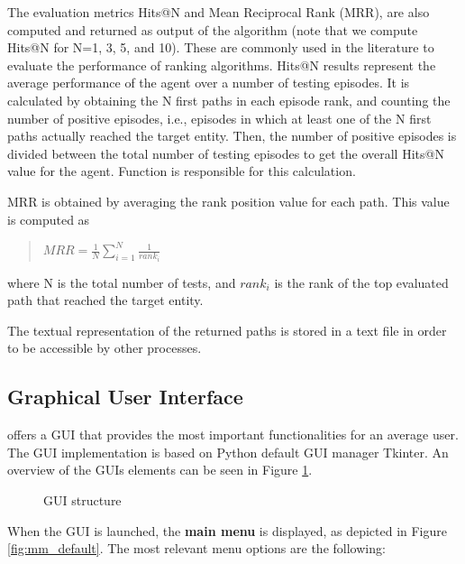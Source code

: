 The evaluation metrics Hits@N and Mean Reciprocal Rank (MRR), are also computed and returned as output of the algorithm (note that we compute Hits@N for N=1, 3, 5, and 10). These are commonly used in the literature to evaluate the performance of ranking algorithms. 
Hits@N results represent the average performance of
the agent over a number of testing episodes. It is calculated by obtaining the 
N first paths in each episode rank, and counting the number of positive episodes, i.e., episodes in which at least one of the N first paths actually reached the target entity. Then, the number of positive episodes is divided between the total number of testing episodes to get the overall Hits@N value for the agent. Function  is responsible for this calculation.

MRR is obtained by averaging the rank position value for each path. This value is computed as

\begin{quote}
 \centering
    $ MRR = \frac{1}{N} \sum_{i=1}^{N} \frac{1}{rank_i}$
\end{quote}

where N is the total number of tests, and $rank_i$ is the rank of the top evaluated path that reached the target entity.

The textual representation of the returned paths is stored in a text file in order to be accessible by other processes. 

\subsection{Graphical User Interface} \label{sec:framework-GUI}

\toolname{} offers a GUI that provides the most important functionalities for an average user. The GUI implementation is based on Python default GUI manager Tkinter. An overview of the GUIs elements can be seen in Figure \ref{fig:GUI_structure}.


\begin{figure}[!h]
    \centering
    
    \caption{\toolname{} GUI structure}
    \label{fig:GUI_structure}
\end{figure}


When the GUI is launched, the \textbf{main menu} is displayed, as depicted in Figure \ref{fig:mm_default}. The most relevant menu options are the following:

